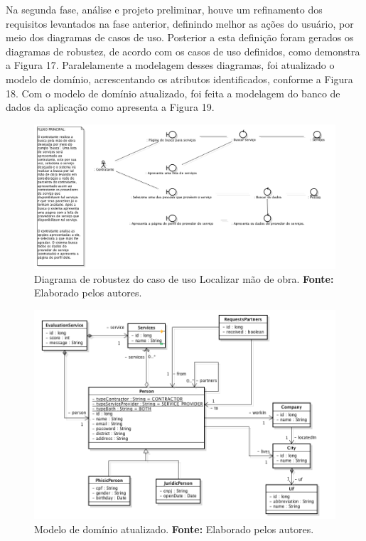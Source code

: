 \par Na segunda fase, análise e projeto preliminar, houve um refinamento dos requisitos levantados na fase anterior, definindo melhor as ações do usuário, por meio dos diagramas de casos de uso. Posterior a esta definição foram gerados os diagramas de robustez, de acordo com os casos de uso definidos, como demonstra a Figura 17. Paralelamente a modelagem desses diagramas, foi atualizado o modelo de domínio, acrescentando os atributos identificados, conforme a Figura 18. Com o modelo de domínio atualizado, foi feita a modelagem do banco de dados da aplicação como apresenta a Figura 19.

\begin{figure}[h!]
	\centerline{\includegraphics[scale=0.35]{./imagens/robustez.png}}
	\caption[Diagrama de robustez do caso de uso Localizar mão de obra]
	{Diagrama de robustez do caso de uso Localizar mão de obra. \textbf{Fonte:} Elaborado pelos autores.}
	\label{fig:exemplo1}
\end{figure}

\begin{figure}[h!]
	\centerline{\includegraphics[scale=0.6]{./imagens/modelo-dominio-com-atributos.png}}
	\caption[Modelo de domínio atualizado]
	{Modelo de domínio atualizado. \textbf{Fonte:} Elaborado pelos autores.}
	\label{fig:exemplo1}
\end{figure} 

